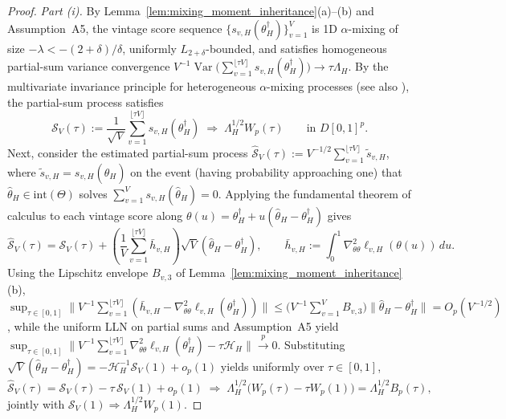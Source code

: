 \begin{proof}
\emph{Part (i).} By Lemma~\ref{lem:mixing_moment_inheritance}(a)--(b) and Assumption~A5, the vintage score sequence $\{s_{v,H}(\theta_H^\dagger)\}_{v=1}^V$ is 1D $\alpha$-mixing of size $-\lambda < -(2+\delta)/\delta$, uniformly $L_{2+\delta}$-bounded, and satisfies homogeneous partial-sum variance convergence $V^{-1}\operatorname{Var}\bigl(\sum_{v=1}^{\lfloor \tau V \rfloor} s_{v,H}(\theta_H^\dagger)\bigr) \to \tau \Lambda_H$. By the multivariate invariance principle for heterogeneous $\alpha$-mixing processes \citep[Theorem~2.11]{WW88} (see also \citealp[Theorem~29.6]{Davidson94}), the partial-sum process satisfies
\[
\mathcal{S}_V(\tau) := \frac{1}{\sqrt{V}}\sum_{v=1}^{\lfloor \tau V \rfloor} s_{v,H}(\theta_H^\dagger) \;\Rightarrow\; \Lambda_H^{1/2} W_p(\tau) \qquad \text{in } D[0,1]^p.
\]
Next, consider the estimated partial-sum process $\hat{\mathcal{S}}_V(\tau) := V^{-1/2}\sum_{v=1}^{\lfloor \tau V \rfloor} \tilde{s}_{v,H}$, where $\tilde{s}_{v,H} = s_{v,H}(\hat\theta_H)$ on the event (having probability approaching one) that $\hat\theta_H \in \mathrm{int}(\Theta)$ solves $\sum_{v=1}^V s_{v,H}(\hat\theta_H) = 0$. Applying the fundamental theorem of calculus to each vintage score along $\theta(u) = \theta_H^\dagger + u(\hat\theta_H - \theta_H^\dagger)$ gives
\[
\hat{\mathcal{S}}_V(\tau)
= \mathcal{S}_V(\tau) + \left(\frac{1}{V}\sum_{v=1}^{\lfloor \tau V \rfloor} \bar{h}_{v,H}\right)\sqrt{V}(\hat\theta_H - \theta_H^\dagger),
\qquad
\bar{h}_{v,H} := \int_0^1 \nabla_{\theta\theta}^2 \ell_{v,H}(\theta(u))\,du.
\]
Using the Lipschitz envelope $B_{v,3}$ of Lemma~\ref{lem:mixing_moment_inheritance}(b), $\sup_{\tau\in[0,1]}\bigl\|V^{-1}\sum_{v=1}^{\lfloor \tau V \rfloor} (\bar{h}_{v,H} - \nabla_{\theta\theta}^2 \ell_{v,H}(\theta_H^\dagger))\bigr\| \le \bigl(V^{-1}\sum_{v=1}^V B_{v,3}\bigr)\|\hat\theta_H - \theta_H^\dagger\| = O_p(V^{-1/2})$, while the uniform LLN on partial sums and Assumption~A5 yield $\sup_{\tau\in[0,1]}\bigl\|V^{-1}\sum_{v=1}^{\lfloor \tau V \rfloor} \nabla_{\theta\theta}^2 \ell_{v,H}(\theta_H^\dagger) - \tau \mathcal{H}_H\bigr\| \xrightarrow{p} 0$. Substituting $\sqrt{V}(\hat\theta_H - \theta_H^\dagger) = -\mathcal{H}_H^{-1}\mathcal{S}_V(1) + o_p(1)$ yields uniformly over $\tau \in [0,1]$,
\[
\hat{\mathcal{S}}_V(\tau)
= \mathcal{S}_V(\tau) - \tau\,\mathcal{S}_V(1) + o_p(1)
\;\Rightarrow\; \Lambda_H^{1/2}\bigl(W_p(\tau) - \tau W_p(1)\bigr) = \Lambda_H^{1/2} B_p(\tau),
\]
jointly with $\mathcal{S}_V(1) \Rightarrow \Lambda_H^{1/2} W_p(1)$.


\end{proof}
